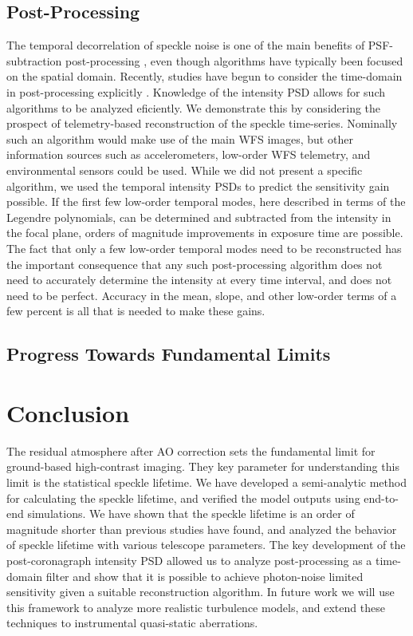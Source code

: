 \documentclass[10pt,preprint]{aastex631}
\begin{document}
\subsection{Post-Processing}
The temporal decorrelation of speckle noise is one of the main benefits of PSF-subtraction post-processing \citep{2006ApJ...641..556M}, even though algorithms have typically been focused on the spatial domain.  Recently, studies have begun to consider the time-domain in post-processing explicitly \citep{2021A&A...646A..24S}.  Knowledge of the intensity PSD allows for such algorithms to be analyzed eficiently.  We demonstrate this by considering the prospect of telemetry-based reconstruction of the speckle time-series.  Nominally such an algorithm would make use of the main WFS images, but other information sources such as accelerometers, low-order WFS telemetry, and environmental sensors could be used.  While we did not present a specific algorithm, we used the temporal intensity PSDs to predict the sensitivity gain possible.  If the first few low-order temporal modes, here described in terms of the Legendre polynomials, can be determined and subtracted from the intensity in the focal plane, orders of magnitude improvements in exposure time are possible.  The fact that only a few low-order temporal modes need to be reconstructed has the important consequence that any such post-processing algorithm does not need to accurately determine the intensity at every time interval, and does not need to be perfect.  Accuracy in the mean, slope, and other low-order terms of a few percent is all that is needed to make these gains.

\subsection{Progress Towards Fundamental Limits}


\section{Conclusion}
The residual atmosphere after AO correction sets the fundamental limit for ground-based high-contrast imaging.  They key parameter for understanding this limit is the statistical speckle lifetime.  We have developed a semi-analytic method for calculating the speckle lifetime, and verified the model outputs using end-to-end simulations.  We have shown that the speckle lifetime is an order of magnitude shorter than previous studies have found, and analyzed the behavior of speckle lifetime with various telescope parameters.  The key development of the post-coronagraph intensity PSD allowed us to analyze post-processing as a time-domain filter and show that it is possible to achieve photon-noise limited sensitivity given a suitable reconstruction algorithm. In future work we will use this framework to analyze more realistic turbulence models, and extend these techniques to instrumental quasi-static aberrations.  
\end{document}
